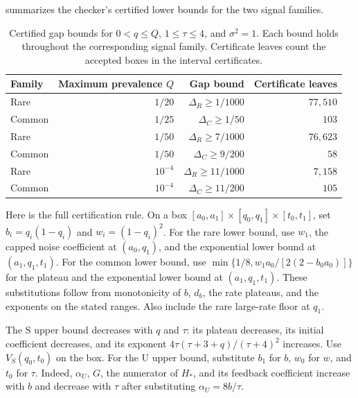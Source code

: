 \documentclass{alt2027}
\begin{document}
 summarizes the checker's certified lower
bounds for the two signal families.
\begin{table}[htbp]
  \centering
  \begin{tabular}{@{}lrrr@{}}
    \toprule
    Family & Maximum prevalence $Q$ &               Gap bound & Certificate leaves \\
    \midrule
    Rare   &                 $1/20$ &  $\Delta_R \geq 1/1000$ &         $77{,}510$ \\
    Common &                 $1/25$ &    $\Delta_C \geq 1/50$ &              $103$ \\
    Rare   &                 $1/50$ &  $\Delta_R \geq 7/1000$ &         $76{,}623$ \\
    Common &                 $1/50$ &   $\Delta_C \geq 9/200$ &               $58$ \\
    Rare   &              $10^{-4}$ & $\Delta_R \geq 11/1000$ &          $7{,}158$ \\
    Common &              $10^{-4}$ &  $\Delta_C \geq 11/200$ &              $105$ \\
    \bottomrule
  \end{tabular}
  \caption{
    Certified gap bounds for $0 < q \leq Q$, $1 \leq \tau \leq 4$, and
    $\sigma^2 = 1$. Each bound holds throughout the corresponding signal family.
    Certificate leaves count the accepted boxes in the interval certificates.
  }
  \label{tab:predictive-certificates}
\end{table}

Here is the full certification rule. On a box
$[a_0,a_1] \times[q_0,q_1] \times[t_0,t_1]$, set $b_i = q_i(1 - q_i)$ and
$w_i = (1 - q_i)^2$. For the rare lower bound, use $w_1$, the capped noise
coefficient at $(a_0,q_1)$, and the exponential lower bound at $(a_1,q_1,t_1)$.
For the common lower bound, use $\min\{1/8,w_1a_0/[2(2 - b_0a_0)]\}$ for the
plateau and the exponential lower bound at $(a_1,q_1,t_1)$. These substitutions
follow from monotonicity of $b$, $d_b$, the rate plateaus, and the exponents on
the stated ranges. Also include the rare large-rate floor at $q_1$.

The S upper bound decreases with $q$ and $\tau$: its plateau decreases, its
initial coefficient decreases, and its exponent
$4\tau(\tau + 3 + q)/(\tau + 4)^2$ increases. Use $V_S(q_0,t_0)$ on the box. For
the U upper bound, substitute $b_1$ for $b$, $w_0$ for $w$, and $t_0$ for
$\tau$. Indeed, $\alpha_U$, $G$, the numerator of $H_*$, and its feedback
coefficient increase with $b$ and decrease with $\tau$ after substituting
$\alpha_U = 8b/\tau$.
\end{document}
